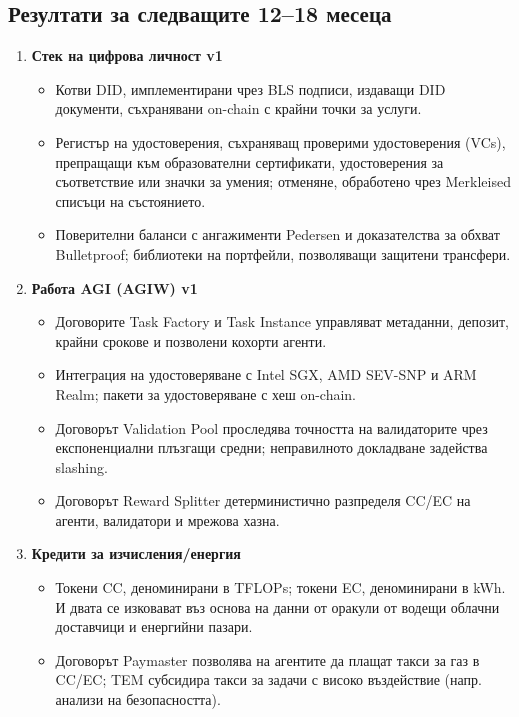 \documentclass[11pt]{article}
\begin{document}
\subsection{Резултати за следващите 12--18 месеца}
\begin{enumerate}[label=\textbf{D\arabic*.}, leftmargin=*]
  \item \textbf{Стек на цифрова личност v1}
  \begin{itemize}[noitemsep]
    \item Котви DID, имплементирани чрез BLS подписи, издаващи DID документи, съхранявани on-chain с крайни точки за услуги.
    \item Регистър на удостоверения, съхраняващ проверими удостоверения (VCs), препращащи към образователни сертификати, удостоверения за съответствие или значки за умения; отменяне, обработено чрез Merkleised списъци на състоянието.
    \item Поверителни баланси с ангажименти Pedersen и доказателства за обхват Bulletproof; библиотеки на портфейли, позволяващи защитени трансфери.
  \end{itemize}
  \item \textbf{Работа AGI (AGIW) v1}
  \begin{itemize}[noitemsep]
    \item Договорите Task Factory и Task Instance управляват метаданни, депозит, крайни срокове и позволени кохорти агенти.
    \item Интеграция на удостоверяване с Intel SGX, AMD SEV-SNP и ARM Realm; пакети за удостоверяване с хеш on-chain.
    \item Договорът Validation Pool проследява точността на валидаторите чрез експоненциални плъзгащи средни; неправилното докладване задейства slashing.
    \item Договорът Reward Splitter детерминистично разпределя CC/EC на агенти, валидатори и мрежова хазна.
  \end{itemize}
  \item \textbf{Кредити за изчисления/енергия}
  \begin{itemize}[noitemsep]
    \item Токени CC, деноминирани в TFLOPs; токени EC, деноминирани в kWh. И двата се изковават въз основа на данни от оракули от водещи облачни доставчици и енергийни пазари.
    \item Договорът Paymaster позволява на агентите да плащат такси за газ в CC/EC; TEM субсидира такси за задачи с високо въздействие (напр. анализи на безопасността).
  \end{itemize}

\end{enumerate}
\end{document}
